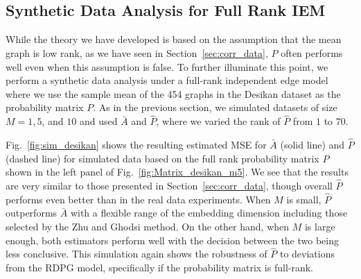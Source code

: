 \documentclass[10pt,letterpaper]{article}
\renewcommand{\hat}{\widehat}
\begin{document}
%
%


\subsection{Synthetic Data Analysis for Full Rank IEM}\label{sec:sim_iem}

While the theory we have developed is based on the assumption that the mean graph is low rank, as we have seen in Section~\ref{sec:corr_data}, $\hat{P}$ often performs well even when this assumption is false. 
To further illuminate this point, we perform a synthetic data analysis under a full-rank independent edge model where we use the sample mean of the 454 graphs in the Desikan dataset as the probability matrix $P$.
As in the previous section, we simulated datasets of size $M=1,5$, and $10$ and used $\bar{A}$ and $\hat{P}$, where we varied the rank of $\hat{P}$ from $1$ to $70$.

Fig.~\ref{fig:sim_desikan} shows the resulting estimated MSE for $\bar{A}$ (solid line) and $\hat{P}$ (dashed line) for simulated data based on the full rank probability matrix $P$ shown in the left panel of Fig.~\ref{fig:Matrix_desikan_m5}.
We see that the results are very similar to those presented in Section~\ref{sec:corr_data}, though overall $\hat{P}$ performs even better than in the real data experiments. 
When $M$ is small, $\hat{P}$ outperforms $\bar{A}$ with a flexible range of the embedding dimension including those selected by the Zhu and Ghodsi method.
On the other hand, when $M$ is large enough, both estimators perform well with the decision between the two being less conclusive.
This simulation again shows the robustness of $\hat{P}$ to deviations from the RDPG model, specifically if the probability matrix is full-rank.
\end{document}
